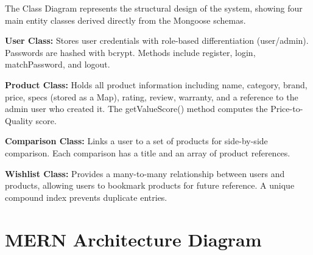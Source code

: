 The Class Diagram represents the structural design of the system, showing four main entity classes derived directly from the Mongoose schemas.

\textbf{User Class:} Stores user credentials with role-based differentiation (user/admin). Passwords are hashed with bcrypt. Methods include register, login, matchPassword, and logout.

\textbf{Product Class:} Holds all product information including name, category, brand, price, specs (stored as a Map), rating, review, warranty, and a reference to the admin user who created it. The getValueScore() method computes the Price-to-Quality score.

\textbf{Comparison Class:} Links a user to a set of products for side-by-side comparison. Each comparison has a title and an array of product references.

\textbf{Wishlist Class:} Provides a many-to-many relationship between users and products, allowing users to bookmark products for future reference. A unique compound index prevents duplicate entries.


\section{MERN Architecture Diagram}

